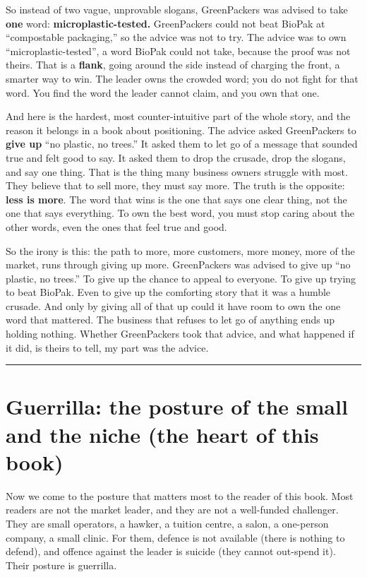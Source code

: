 \documentclass[10pt,twoside,openany]{memoir}
\begin{document}
{So instead of two vague, unprovable slogans, GreenPackers was advised to
take \textbf{one} word: \textbf{microplastic-tested.} GreenPackers could
not beat BioPak at ``compostable packaging,'' so the advice was not to
try. The advice was to own ``microplastic-tested'', a word BioPak could
not take, because the proof was not theirs. That is a \textbf{flank},
going around the side instead of charging the front, a smarter way to
win. The leader owns the crowded word; you do not fight for that word.
You find the word the leader cannot claim, and you own that one.

And here is the hardest, most counter-intuitive part of the whole story,
and the reason it belongs in a book about positioning. The advice asked
GreenPackers to \textbf{give up} ``no plastic, no trees.'' It asked them
to let go of a message that sounded true and felt good to say. It asked
them to drop the crusade, drop the slogans, and say one thing. That is
the thing many business owners struggle with most. They believe that to
sell more, they must say more. The truth is the opposite: \textbf{less
is more}. The word that wins is the one that says one clear thing, not
the one that says everything. To own the best word, you must stop caring
about the other words, even the ones that feel true and good.

So the irony is this: the path to more, more customers, more money, more
of the market, runs through giving up more. GreenPackers was advised to
give up ``no plastic, no trees.'' To give up the chance to appeal to
everyone. To give up trying to beat BioPak. Even to give up the
comforting story that it was a humble crusade. And only by giving all of
that up could it have room to own the one word that mattered. The
business that refuses to let go of anything ends up holding nothing.
Whether GreenPackers took that advice, and what happened if it did, is
theirs to tell, my part was the advice.

\begin{center}\rule{0.5\linewidth}{0.5pt}\end{center}

\FloatBarrier
\chapter{Guerrilla: the posture of the small and the niche (the heart of
this
book)}\label{guerrilla-the-posture-of-the-small-and-the-niche-the-heart-of-this-book}

Now we come to the posture that matters most to the reader of this book.
Most readers are not the market leader, and they are not a well-funded
challenger. They are small operators, a hawker, a tuition centre, a
salon, a one-person company, a small clinic. For them, defence is not
available (there is nothing to defend), and offence against the leader
is suicide (they cannot out-spend it). Their posture is guerrilla.

}
\end{document}
